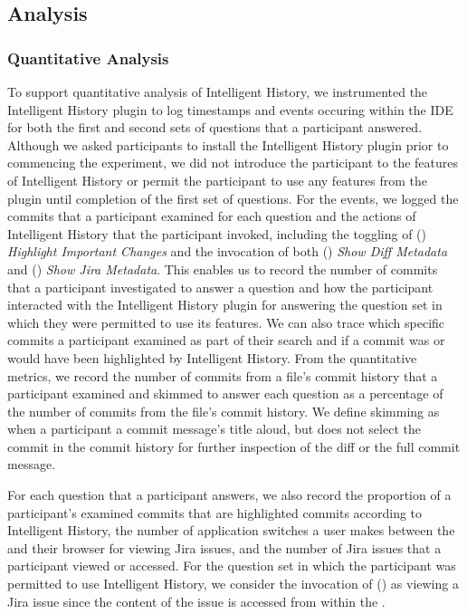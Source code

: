\subsection{Analysis}

\subsubsection{Quantitative Analysis}

To support quantitative analysis of Intelligent History, 
we instrumented the Intelligent History plugin to log timestamps and events occuring within the IDE
for both the first and second sets of questions that a participant answered.
Although we asked participants to install the Intelligent History plugin prior to commencing the
experiment, we did not introduce the participant to the features of Intelligent History 
or permit the participant to use any features from the plugin until completion of the first set of questions.
For the events, we logged the commits that a participant examined for each question 
and the actions of Intelligent History that the participant invoked,
including the toggling of () \textit{Highlight Important Changes} 
and the invocation of both () \textit{Show Diff Metadata} and () \textit{Show Jira Metadata}.
This enables us to record the number of commits that a participant investigated to answer a question 
and how the participant interacted with the Intelligent History plugin for answering the question set in which they were permitted to use its features.
We can also trace which specific commits a participant examined as part of their search and if a commit was 
or would have been highlighted by Intelligent History.
From the quantitative metrics, we record the number of commits from a file's commit history that a participant examined 
and skimmed to answer each question as a percentage of the number of commits from the file's commit history.
We define skimming as when a participant  a commit message's title aloud, but does not select the commit in the commit history
for further inspection of the diff or the full commit message.

For each question that a participant answers, we also record the proportion of a participant's examined commits 
that are highlighted commits according to Intelligent History,
the number of application switches a user makes between the  and their browser for viewing Jira issues,
and the number of Jira issues that a participant viewed or accessed.
For the question set in which the participant was permitted to use Intelligent History, 
we consider the invocation of () as viewing a Jira issue since the content of the issue is accessed from within the .

